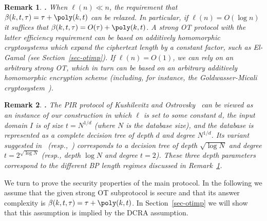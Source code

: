 \documentclass[11pt]{article}
\newcommand{\otl}{{\tau}}
\newtheorem{REMARK}{Remark}[section]
\newenvironment{remark}{\begin{REMARK} \hspace{-.85em} {\bf .} \rm}%
	{\end{REMARK}}
\begin{document}
\begin{remark}
\label{rem-shallow}
When $\ell(n)\ll n$, the requirement that
$\beta(k,t,\otl)=\otl+\poly(k,t)$ can be relaxed. In particular, if
$\ell(n)=O(\log n)$ it suffices that
$\beta(k,t,\otl)=O(\otl)+\poly(k,t)$. A strong OT protocol with the
latter efficiency requirement can be based on additively homomorphic
cryptosystems which expand the ciphertext length by a constant
factor, such as El-Gamal (see Section~\ref{sec-otimp}). If
$\ell(n)=O(1)$, we can rely on an arbitrary strong OT, which in
turn can be based on an arbitrary additively homomorphic encryption scheme
(including, for instance, the Goldwasser-Micali
cryptosystem~\cite{GM}).
\end{remark}

\begin{remark}
The PIR protocol of Kushilevitz and Ostrovsky~\cite{KO97} can be
viewed as an instance of our construction in which $\ell$ is set to
some constant $d$, the input domain $I$ is of size $t=N^{1/d}$
(where $N$ is the database size), and the database is represented
as a complete decision tree of depth $d$ and degree $N^{1/d}$. Its
variant suggested in~\cite{Ste98} (resp.,~\cite{L04}) corresponds
to a decision tree of depth $\sqrt{\log N}$ and degree
$t=2^{\sqrt{\log N}}$ (resp., depth $\log N$ and degree $t=2$).
These three depth parameters correspond to the different BP length
regimes discussed in Remark~\ref{rem-shallow}.
\end{remark}

We turn to prove the security properties of the main protocol. In
the following we assume that the given strong OT subprotocol is
secure and that its answer complexity is
$\beta(k,t,\otl)=\otl+\poly(k,t)$. In Section~\ref{sec-otimp} we
will show that this assumption is implied by the DCRA assumption.
\end{document}
